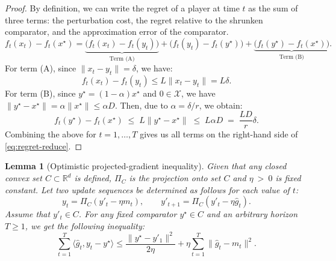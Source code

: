 \documentclass[journal,onecolumn]{IEEEtran}
\newcommand{\cX}{\mathcal{X}}
\theoremstyle{plain}
\newtheorem{lemma}[theorem]{Lemma}
\theoremstyle{definition}
\theoremstyle{remark}
\begin{document}
{\begin{proof}
      By definition, we can write the regret of a player at time $t$ as the sum of three terms: the perturbation cost, the regret relative to the shrunken comparator, and the approximation error of the comparator.
    \begin{equation*}
        f_{t}(x_{t}) - f_{t}(x^{\star})= \underbrace{\big(f_t(x_t) - f_t(y_t)\big)}
        _{\text{Term (A)}}+ \big(f_{t}(y_{t}) - f_{t}(y^{\star})\big)+ \underbrace{\big(f_t(y^\star)
        - f_t(x^\star)\big)}_{\text{Term (B)}}.
    \end{equation*}
    For term (A), since $\|x_{t}- y_{t}\| = \delta$, we have:
    \begin{equation*}
        f_{t}(x_{t}) - f_{t}(y_{t})\le L\|x_{t}- y_{t}\| = L\delta.
    \end{equation*}
    For term (B), since $y^{\star}= (1-\alpha)x^{\star}$ and $0 \in \cX$, we have
    $\|y^{\star}- x^{\star}\| = \alpha \|x^{\star}\| \le \alpha D$. Then, due to $\alpha
    = \delta/r$, we obtain:
    \begin{equation*}
        f_{t}(y^{\star}) - f_{t}(x^{\star}) \;\le\; L\|y^{\star}- x^{\star}\| \;
        \le\; L\alpha D \;=\; \frac{LD}{r}\delta.
    \end{equation*}
    Combining the above for $t=1,\dots,T$ gives us all terms on the right-hand side of \eqref{eq:regret-reduce}. 
\end{proof}

\begin{lemma}[Optimistic projected-gradient inequality]
    \label{lem:optimistic-ogd} Given that any closed convex set $C\subset\mathbb{R}^{d}$ is defined, $\Pi_{C}$ is the projection onto set $C$ and $\eta\ >\ 0$ is fixed constant. 
    Let two update sequences be determined as follows for each value of $t$:
    \begin{equation*}
        y_{t}= \Pi_{C}(y'_{t}-\eta m_{t}), \qquad y'_{t+1}= \Pi_{C}(y'_{t}-\eta \hat
        g_{t}).
    \end{equation*}
    Assume that $y'_{t}\in C$. For any fixed comparator $y^{\star}\in C$ and an arbitrary horizon $T\ge 1$, we get the following inequality:
    \begin{equation*}
        \sum_{t=1}^{T}\langle \hat g_{t}, y_{t}-y^{\star}\rangle \le \frac{\|y^{\star}-y'_{1}\|^{2}}{2\eta}
        + \eta\sum_{t=1}^{T}\|\hat g_{t}-m_{t}\|^{2}. \label{eq:optimistic-ogd}
    \end{equation*}
\end{lemma}

}
\end{document}
